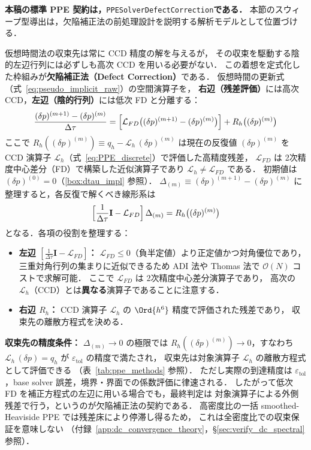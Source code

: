 \noindent\textbf{本稿の標準 PPE 契約は，}\texttt{PPESolverDefectCorrection}\textbf{である．}
本節のスウィープ型導出は，欠陥補正法の前処理設計を説明する解析モデルとして位置づける．

仮想時間法の収束先は常に CCD 精度の解を与えるが，
その収束を駆動する陰的左辺行列には必ずしも高次 CCD を用いる必要がない．
この着想を定式化した枠組みが\textbf{欠陥補正法（Defect Correction）}である．
仮想時間の更新式（式~\eqref{eq:pseudo_implicit_raw}）の空間演算子を，
\textbf{右辺（残差評価）}には高次 CCD，\textbf{左辺（陰的行列）}には低次 FD と分離する：
\begin{equation}
  \frac{(\delta p)^{(m+1)}-(\delta p)^{(m)}}{\Delta\tau}
  = \Bigl[\mathcal{L}_{FD}\bigl((\delta p)^{(m+1)}-(\delta p)^{(m)}\bigr)\Bigr]
    + R_h\bigl((\delta p)^{(m)}\bigr)
  \label{eq:defect_correction_split}
\end{equation}
ここで $R_h((\delta p)^{(m)}) \equiv q_h - \mathcal{L}_h\,(\delta p)^{(m)}$ は現在の反復値 $(\delta p)^{(m)}$
を CCD 演算子 $\mathcal{L}_h$（式~\eqref{eq:PPE_discrete}）で評価した高精度残差，
$\mathcal{L}_{FD}$ は 2次精度中心差分（FD）で構築した近似演算子であり $\mathcal{L}_h \neq \mathcal{L}_{FD}$ である．
初期値は $(\delta p)^{(0)} = 0$（\ref{box:dtau_impl} 参照）．
$\Delta_{(m)} \equiv (\delta p)^{(m+1)}-(\delta p)^{(m)}$ に整理すると，各反復で解くべき線形系は
\begin{equation}
  \Bigl[\frac{1}{\Delta\tau}\mathbf{I} - \mathcal{L}_{FD}\Bigr]\,\Delta_{(m)}
  = R_h\bigl((\delta p)^{(m)}\bigr)
  \label{eq:defect_correction_linear}
\end{equation}
となる．各項の役割を整理する：
\begin{itemize}
  \item \textbf{左辺 $[\frac{1}{\Delta\tau}\mathbf{I} - \mathcal{L}_{FD}]$：}
        $\mathcal{L}_{FD} \le 0$（負半定値）より正定値かつ対角優位であり，
        三重対角行列の集まりに近似できるため ADI 法や
        Thomas 法で $\mathcal{O}(N)$ コストで求解可能．
        ここで $\mathcal{L}_{FD}$ は 2次精度中心差分演算子であり，
        高次の $\mathcal{L}_h$（CCD）とは\textbf{異なる}演算子であることに注意する．
  \item \textbf{右辺 $R_h$：} CCD 演算子 $\mathcal{L}_h$ の $\Ord{h^6}$ 精度で評価された残差であり，
        収束先の離散方程式を決める．
\end{itemize}

\textbf{収束先の精度条件：}
$\Delta_{(m)} \to 0$ の極限では $R_h((\delta p)^{(m)}) \to 0$，すなわち
$\mathcal{L}_h\,(\delta p) = q_h$ が $\varepsilon_\mathrm{tol}$ の精度で満たされ，
収束先は対象演算子 $\mathcal{L}_h$ の離散方程式として評価できる
（表~\ref{tab:ppe_methods} 参照）．
ただし実際の到達精度は $\varepsilon_\mathrm{tol}$，base solver 誤差，境界・界面での係数評価に律速される．
したがって低次 FD を補正方程式の左辺に用いる場合でも，最終判定は
対象演算子による外側残差で行う，というのが欠陥補正法の契約である．
高密度比の一括 smoothed-Heaviside PPE では残差床により停滞し得るため，
これは全密度比での収束保証を意味しない
（付録~\ref{app:dc_convergence_theory}，§\ref{sec:verify_dc_spectral} 参照）．

